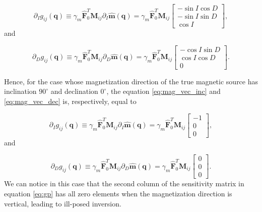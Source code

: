 \begin{equation}
\partial_{I} g_{ij} (\mathbf{q})  \equiv \gamma_m \hat{\mathbf{F}}_0^T \mathbf{M}_{ij}  \partial_{I} \hat{\mathbf{m}}(\mathbf{q}) =  \gamma_m \hat{\mathbf{F}}_0^T \mathbf{M}_{ij} 
	\left[ \begin{array}{c}
		-\sin I \cos D \\
		-\sin I \sin D\\
		 \cos I
	\end{array} \right], 
	\label{eq:mag_vec_inc}
\end{equation}
and 

\begin{equation}
	\partial_{D} g_{ij} (\mathbf{q})  \equiv \gamma_m \hat{\mathbf{F}}_0^T \mathbf{M}_{ij}  \partial_{D} \hat{\mathbf{m}}(\mathbf{q}) =  \gamma_m \hat{\mathbf{F}}_0^T \mathbf{M}_{ij} 
	\left[ \begin{array}{c}
		-\cos I \sin D \\
		 \cos I \cos D\\
		0
	\end{array} \right]. 
	\label{eq:mag_vec_dec}
\end{equation}

Hence, for the case whose magnetization direction of the true magnetic source has inclination $90^\circ$ and declination $0^\circ$, the equation \ref{eq:mag_vec_inc} and \ref{eq:mag_vec_dec} is, respectively, equal to 

 
\begin{equation}
\partial_{I} g_{ij} (\mathbf{q})  \equiv \gamma_m \hat{\mathbf{F}}_0^T \mathbf{M}_{ij}  \partial_{I} \hat{\mathbf{m}}(\mathbf{q}) =  \gamma_m \hat{\mathbf{F}}_0^T \mathbf{M}_{ij} 
	\left[ \begin{array}{c}
		-1 \\
		 0 \\
		 0
	\end{array} \right], 
	\label{eq:mag_vec_inc_90}
\end{equation}
and 

\begin{equation}
	\partial_{D} g_{ij} (\mathbf{q})  \equiv \gamma_m \hat{\mathbf{F}}_0^T \mathbf{M}_{ij}  \partial_{D} \hat{\mathbf{m}}(\mathbf{q}) =  \gamma_m \hat{\mathbf{F}}_0^T \mathbf{M}_{ij}
	\left[ \begin{array}{c}
		0 \\
		0 \\
		0
	\end{array} \right]. 
	\label{eq:mag_vec_dec_0}
\end{equation}
We can notice in this case that the second column of the sensitivity matrix in equation \ref{eq:gp} has all zero elements when the magnetization direction is vertical, leading to ill-posed inversion.

           



